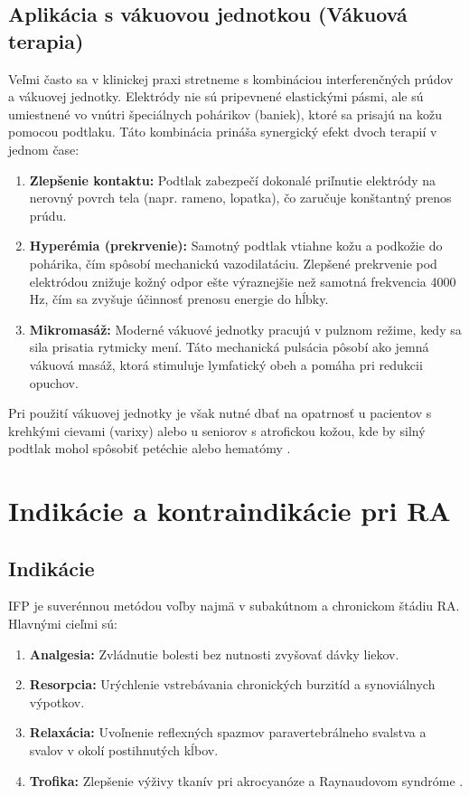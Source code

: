 \subsection{Aplikácia s vákuovou jednotkou (Vákuová terapia)}
Veľmi často sa v klinickej praxi stretneme s kombináciou interferenčných prúdov a vákuovej jednotky. Elektródy nie sú pripevnené elastickými pásmi, ale sú umiestnené vo vnútri špeciálnych pohárikov (baniek), ktoré sa prisajú na kožu pomocou podtlaku.
Táto kombinácia prináša synergický efekt dvoch terapií v jednom čase:
\begin{enumerate}
    \item \textbf{Zlepšenie kontaktu:} Podtlak zabezpečí dokonalé priľnutie elektródy na nerovný povrch tela (napr. rameno, lopatka), čo zaručuje konštantný prenos prúdu.
    \item \textbf{Hyperémia (prekrvenie):} Samotný podtlak vtiahne kožu a podkožie do pohárika, čím spôsobí mechanickú vazodilatáciu. Zlepšené prekrvenie pod elektródou znižuje kožný odpor ešte výraznejšie než samotná frekvencia 4000 Hz, čím sa zvyšuje účinnosť prenosu energie do hĺbky.
    \item \textbf{Mikromasáž:} Moderné vákuové jednotky pracujú v pulznom režime, kedy sa sila prisatia rytmicky mení. Táto mechanická pulsácia pôsobí ako jemná vákuová masáž, ktorá stimuluje lymfatický obeh a pomáha pri redukcii opuchov.
\end{enumerate}
Pri použití vákuovej jednotky je však nutné dbať na opatrnosť u pacientov s krehkými cievami (varixy) alebo u seniorov s atrofickou kožou, kde by silný podtlak mohol spôsobiť petéchie alebo hematómy \parencite{Podebradsky2009}.

\section{Indikácie a kontraindikácie pri RA}

\subsection{Indikácie}
IFP je suverénnou metódou voľby najmä v subakútnom a chronickom štádiu RA. Hlavnými cieľmi sú:
\begin{enumerate}
    \item \textbf{Analgesia:} Zvládnutie bolesti bez nutnosti zvyšovať dávky liekov.
    \item \textbf{Resorpcia:} Urýchlenie vstrebávania chronických burzitíd a synoviálnych výpotkov.
    \item \textbf{Relaxácia:} Uvoľnenie reflexných spazmov paravertebrálneho svalstva a svalov v okolí postihnutých kĺbov.
    \item \textbf{Trofika:} Zlepšenie výživy tkanív pri akrocyanóze a Raynaudovom syndróme \parencite{Kolar2012, Capko2010}.
\end{enumerate}

